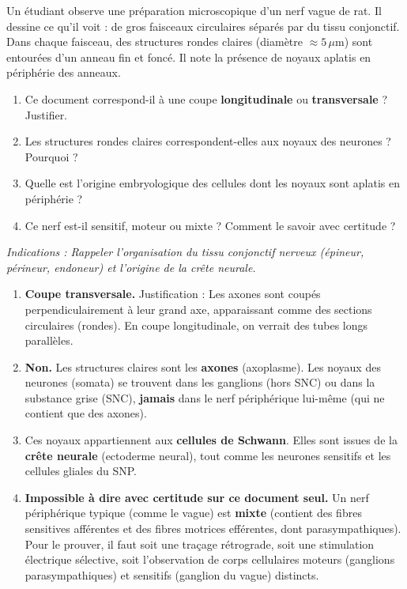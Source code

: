 \documentclass[11pt]{article}
\begin{document}
\begin{exercice}
Un étudiant observe une préparation microscopique d'un nerf vague de rat. Il dessine ce qu'il voit : de gros faisceaux circulaires séparés par du tissu conjonctif. Dans chaque faisceau, des structures rondes claires (diamètre $\approx 5\,\mu\text{m}$) sont entourées d'un anneau fin et foncé. Il note la présence de noyaux aplatis en périphérie des anneaux.
\begin{enumerate}
    \item Ce document correspond-il à une coupe \textbf{longitudinale} ou \textbf{transversale} ? Justifier.
    \item Les structures rondes claires correspondent-elles aux noyaux des neurones ? Pourquoi ?
    \item Quelle est l'origine embryologique des cellules dont les noyaux sont aplatis en périphérie ?
    \item Ce nerf est-il sensitif, moteur ou mixte ? Comment le savoir avec certitude ?
\end{enumerate}
\emph{Indications : Rappeler l'organisation du tissu conjonctif nerveux (épineur, périneur, endoneur) et l'origine de la crête neurale.}
\end{exercice}

\begin{corrige}
\begin{enumerate}
    \item \textbf{Coupe transversale.} Justification : Les axones sont coupés perpendiculairement à leur grand axe, apparaissant comme des sections circulaires (rondes). En coupe longitudinale, on verrait des tubes longs parallèles.
    \item \textbf{Non.} Les structures claires sont les \textbf{axones} (axoplasme). Les noyaux des neurones (somata) se trouvent dans les ganglions (hors SNC) ou dans la substance grise (SNC), \textbf{jamais} dans le nerf périphérique lui-même (qui ne contient que des axones).
    \item Ces noyaux appartiennent aux \textbf{cellules de Schwann}. Elles sont issues de la \textbf{crête neurale} (ectoderme neural), tout comme les neurones sensitifs et les cellules gliales du SNP.
    \item \textbf{Impossible à dire avec certitude sur ce document seul.} Un nerf périphérique typique (comme le vague) est \textbf{mixte} (contient des fibres sensitives afférentes et des fibres motrices efférentes, dont parasympathiques). Pour le prouver, il faut soit une traçage rétrograde, soit une stimulation électrique sélective, soit l'observation de corps cellulaires moteurs (ganglions parasympathiques) et sensitifs (ganglion du vague) distincts.
\end{enumerate}
\end{corrige}
\end{document}
